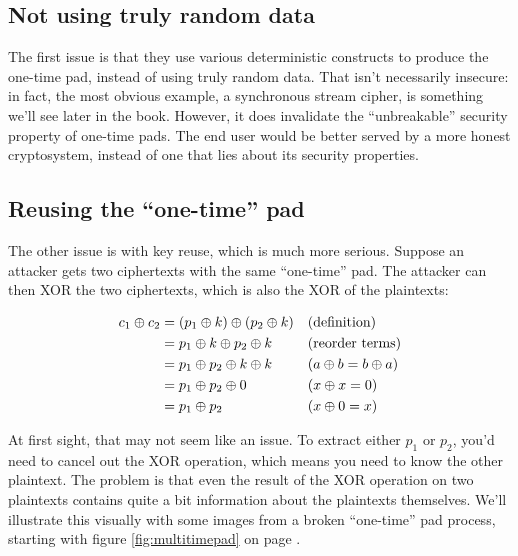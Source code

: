 \documentclass[11pt,ebook,table,dvipsnames]{memoir}
\begin{document}
\subsection{Not using truly random data}
\label{sec-2-1-5-1}

The first issue is that they use various deterministic constructs to
produce the one-time pad, instead of using truly random data. That
isn't necessarily insecure: in fact, the most obvious example, a
synchronous \gls{stream cipher}, is something we'll see later in the
book. However, it does invalidate the \enquote{unbreakable} security property
of one-time pads. The end user would be better served by a more honest
cryptosystem, instead of one that lies about its security properties.
\subsection{Reusing the \enquote{one-time} pad}
\label{sec-2-1-5-2}

The other issue is with key reuse, which is much more serious. Suppose
an attacker gets two ciphertexts with the same \enquote{one-time} pad. The
attacker can then XOR the two ciphertexts, which is also the XOR of
the plaintexts:

\begin{align*}
c_1 \oplus c_2
&= (p_1 \oplus k) \oplus (p_2 \oplus k) && (\text{definition})\\
&= p_1 \oplus k \oplus p_2 \oplus k && (\text{reorder terms})\\
&= p_1 \oplus p_2 \oplus k \oplus k && (a \oplus b = b \oplus a) \\
&= p_1 \oplus p_2 \oplus 0 && (x \oplus x = 0) \\
&= p_1 \oplus p_2 && (x \oplus 0 = x)
\end{align*}

At first sight, that may not seem like an issue. To extract either
$p_1$ or $p_2$, you'd need to cancel out the XOR operation, which
means you need to know the other plaintext. The problem is that even
the result of the XOR operation on two plaintexts contains quite a bit
information about the plaintexts themselves. We'll illustrate this
visually with some images from a broken \enquote{one-time} pad process,
starting with figure \ref{fig:multitimepad} on page
\pageref{fig:multitimepad}.
\end{document}
